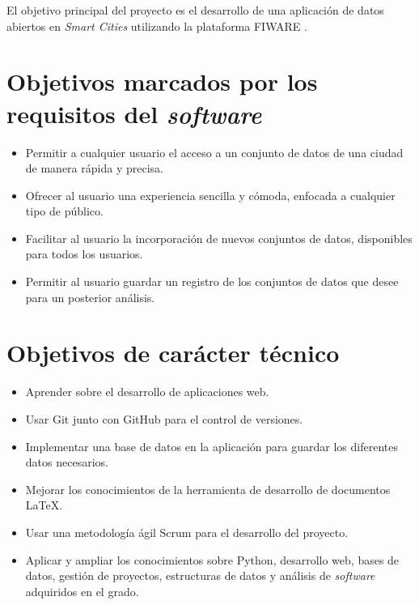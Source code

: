\begin{comment}
Este apartado explica de forma precisa y concisa cuales son los objetivos que se persiguen con la realización del proyecto. Se puede distinguir entre los objetivos marcados por los requisitos del software a construir y los objetivos de carácter técnico que plantea a la hora de llevar a la práctica el proyecto.
\end{comment}

El objetivo principal del proyecto es el desarrollo de una aplicación de datos abiertos en \textit{Smart Cities} utilizando la plataforma FIWARE \cite{fiware}. 

\section{Objetivos marcados por los requisitos del \textit{software}}\label{objetivos-generales}

\begin{itemize}
\tightlist
\item
  Permitir a cualquier usuario el acceso a un conjunto de datos de una ciudad de manera rápida y precisa.
\item
  Ofrecer al usuario una experiencia sencilla y cómoda, enfocada a cualquier tipo de público.
\item
  Facilitar al usuario la incorporación de nuevos conjuntos de datos, disponibles para todos los usuarios.
\item
  Permitir al usuario guardar un registro de los conjuntos de datos que desee para un posterior análisis.
\end{itemize}



\section{Objetivos de carácter técnico}\label{objetivos-personales}

\begin{itemize}
\tightlist

\item Aprender sobre el desarrollo de aplicaciones web.
\item Usar Git junto con GitHub para el control de versiones.
\item Implementar una base de datos en la aplicación para guardar los diferentes datos necesarios.
\item Mejorar los conocimientos de la herramienta de desarrollo de documentos \LaTeX{}.
\item Usar una metodología ágil Scrum para el desarrollo del proyecto.
\item Aplicar y ampliar los conocimientos sobre Python, desarrollo web, bases de datos, gestión de proyectos, estructuras de datos y análisis de \textit{software} adquiridos en el grado.


\end{itemize}